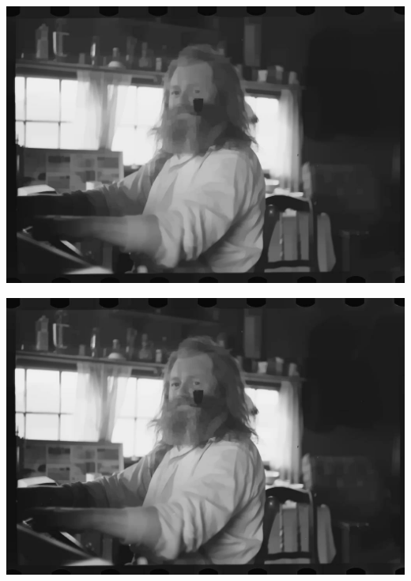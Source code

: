 \begin{frame}

\begin{center}
\includegraphics[width=\textwidth]{img/img2.jpg}
\end{center}

\end{frame}

\begin{frame}

\begin{center}
\includegraphics[width=\textwidth]{img/img3.jpg}
\end{center}

\end{frame}


